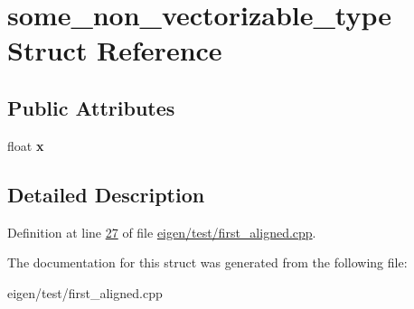\hypertarget{structsome__non__vectorizable__type}{}\section{some\+\_\+non\+\_\+vectorizable\+\_\+type Struct Reference}
\label{structsome__non__vectorizable__type}
\subsection*{Public Attributes}
\begin{DoxyCompactItemize}
\item 
\mbox{\label{structsome__non__vectorizable__type_ad194cbb62d0966a126f0a470d4f9926a}} 
float {\bfseries x}
\end{DoxyCompactItemize}


\subsection{Detailed Description}


Definition at line \hyperlink{eigen_2test_2first__aligned_8cpp_source_l00027}{27} of file \hyperlink{eigen_2test_2first__aligned_8cpp_source}{eigen/test/first\+\_\+aligned.\+cpp}.



The documentation for this struct was generated from the following file\+:\begin{DoxyCompactItemize}
\item 
eigen/test/first\+\_\+aligned.\+cpp\end{DoxyCompactItemize}
